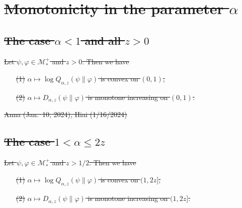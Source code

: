 \documentclass[12pt]{article}
\newtheorem{theorem}{Theorem}[section]
\theoremstyle{definition}
\theoremstyle{remark}
\def\Me{\mathcal M}
\def\ffi{\varphi}
\providecommand{\DIFdeltex}[1]{{\protect\color{red}\sout{#1}}}                      %
\providecommand{\DIFdelbegin}{} %
\providecommand{\DIFdel}[1]{\texorpdfstring{\DIFdeltex{#1}}{}} %
\begin{document}
\DIFdelbegin \section{\DIFdel{Monotonicity in the parameter $\alpha$}}
\addtocounter{section}{-1}%

\subsection{\DIFdel{The case $\alpha<1$ and all $z>0$}}
\addtocounter{subsection}{-1}%

\DIFdel{Let $\psi,\ffi\in\Me_*^+$ and $z>0$. Then we have
}%
\begin{itemize}%
\item[\DIFdel{(1)}]%
\DIFdel{$\alpha\mapsto\log Q_{\alpha,z}(\psi\|\ffi)$ is convex on $(0,1)$,
}%
\item[\DIFdel{(2)}]%
\DIFdel{$\alpha\mapsto D_{\alpha,z}(\psi\|\ffi)$ is monotone increasing on $(0,1)$.
}
\end{itemize}%
\DIFdel{Anna (Jan.\ 10, 2024), Hiai (1/16/2024)}%

\subsection{\DIFdel{The case $1<\alpha\le2z$}}
\addtocounter{subsection}{-1}%

\DIFdel{Let $\psi,\ffi\in\Me_*^+$ and $z>1/2$. Then we have
}%
\begin{itemize}%
\item[\DIFdel{(1)}]%
\DIFdel{$\alpha\mapsto\log Q_{\alpha,z}(\psi\|\ffi)$ is convex on $(1,2z]$,
}%
\item[\DIFdel{(2)}]%
\DIFdel{$\alpha\mapsto D_{\alpha,z}(\psi\|\ffi)$ is monotone increasing on $(1,2z]$.
}
\end{itemize}%
\end{document}
